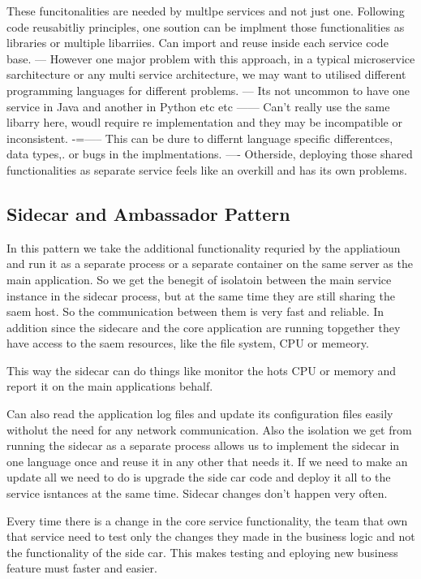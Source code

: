 \documentclass[a4paper, 11pt]{book}
\begin{document}
    These funcitonalities are needed by multlpe services and not just one.
    Following code reusabitliy principles, one soution can be implment those functionalities as libraries or multiple libarriies.
    Can import and reuse inside each service code base.
    --- However one major problem with this approach, in a typical microservice sarchitecture or any multi service architecture, we may want to utilised different programming languages for different problems.
    --- Its not uncommon to have one service in Java and another in Python etc etc
    ------ Can't really use the same libarry here, woudl require re implementation and they may be incompatible or inconsistent.
    -=----- This can be dure to differnt language specific differentces, data types,. or bugs in the implmentations.
    ---- Otherside, deploying those shared functionalities as separate service feels like an overkill and has its own problems.

    \subsection{Sidecar and Ambassador Pattern}
    In this pattern we take the additional functionality requried by the appliatioun and run it as a separate process or a separate container on the same server as the main application.
    So we get the benegit of isolatoin between the main service instance in the sidecar process, but at the same time they are still sharing the saem host.
    So the communication between them is very fast and reliable.
    In addition since the sidecare and the core application are running topgether they have access to the saem resources, like the file system, CPU or memeory.

    This way the sidecar can do things like monitor the hots CPU or memory and report it on the main applications behalf.

    Can also read the application log files and update its configuration files easily witholut the need for any network communication.
    Also the isolation we get from running the sidecar as a separate process allows us to implement the sidecar in one language once and reuse it in any other that needs it.
    If we need to make an update all we need to do is upgrade the side car code and deploy it all to the service isntances at the same time.
    Sidecar changes don't happen very often.

    Every time there is a change in the core service functionality, the team that own that service need to test only the changes they made in the business logic and not the functionality of the side car.
    This makes testing and eploying new business feature must faster and easier.
\end{document}
